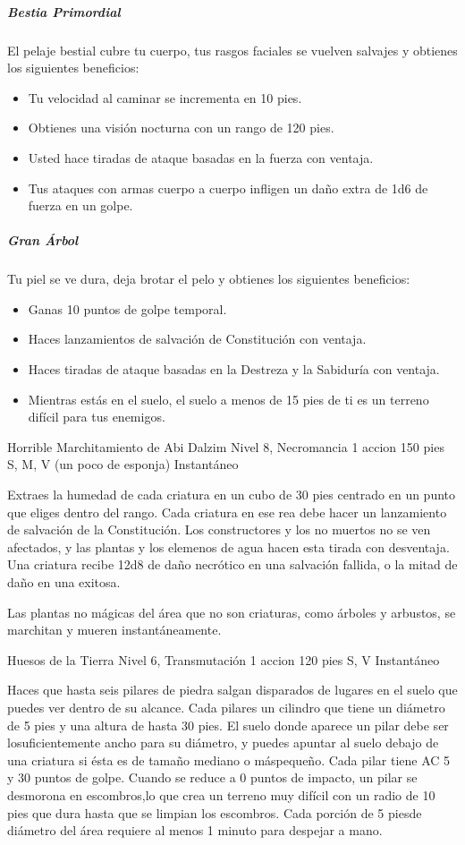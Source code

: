 \documentclass[a4paper,twocolumn,openany,10pt]{dndbook}
\begin{document}
	\subparagraph{Bestia Primordial} El pelaje bestial cubre tu cuerpo, tus rasgos faciales se vuelven salvajes y obtienes los
	siguientes beneficios:
	\begin{itemize}
		\item Tu velocidad al caminar se incrementa en 10 pies.
		\item Obtienes una visión nocturna con un rango de 120 pies.
		\item Usted hace tiradas de ataque basadas en la fuerza con ventaja.
		\item Tus ataques con armas cuerpo a cuerpo infligen un daño extra de 1d6 de fuerza en un golpe.
	\end{itemize}
	
	\subparagraph{Gran Árbol} Tu piel se ve dura, deja brotar el pelo y obtienes los siguientes beneficios:
	\begin{itemize}
		\item Ganas 10 puntos de golpe temporal.
		\item Haces lanzamientos de salvación de Constitución con ventaja.
		\item Haces tiradas de ataque basadas en la Destreza y la Sabiduría con ventaja.
		\item Mientras estás en el suelo, el suelo a menos de 15 pies de ti es un terreno difícil para tus enemigos.
	\end{itemize}

\spellheader%
	{Horrible Marchitamiento de Abi Dalzim}
	{Nivel 8, Necromancia}
	{1 accion}
	{150 pies}
	{S, M, V (un poco de esponja)}
	{Instantáneo}

	Extraes la humedad de cada criatura en un cubo de 30 pies centrado en un punto que eliges dentro del rango. Cada criatura en
	ese rea debe hacer un lanzamiento de salvación de la Constitución. Los constructores y los no muertos no se ven afectados, y
	las plantas y los elemenos de agua hacen esta tirada con desventaja. Una criatura recibe 12d8 de daño necrótico en una
	salvación fallida, o la mitad de daño en una exitosa.

	Las plantas no mágicas del área que no son criaturas, como árboles y arbustos, se marchitan y mueren instantáneamente. 

\spellheader%
	{Huesos de la Tierra}
	{Nivel 6, Transmutación}
	{1 accion}
	{120 pies}
	{S, V}
	{Instantáneo}
	
	Haces que hasta seis pilares de piedra salgan disparados de lugares en el suelo que puedes ver dentro de su alcance. Cada
	pilares un cilindro que tiene un diámetro de 5 pies y una altura de hasta 30 pies. El suelo donde aparece un pilar debe ser
	losuficientemente ancho para su diámetro, y puedes apuntar al suelo debajo de una criatura si ésta es de tamaño mediano o
	máspequeño. Cada pilar tiene AC 5 y 30 puntos de golpe. Cuando se reduce a 0 puntos de impacto, un pilar se desmorona en
	escombros,lo que crea un terreno muy difícil con un radio de 10 pies que dura hasta que se limpian los escombros. Cada
	porción de 5 piesde diámetro del área requiere al menos 1 minuto para despejar a mano.
	
\end{document}
